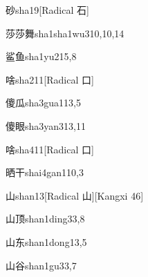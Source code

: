 \begin{verbete}{砂}{sha1}{9}[Radical 石]
\end{verbete}

\begin{verbete}{莎莎舞}{sha1sha1wu3}{10,10,14}
\end{verbete}

\begin{verbete}{鲨鱼}{sha1yu2}{15,8}
\end{verbete}

\begin{verbete}{啥}{sha2}{11}[Radical 口]
\end{verbete}

\begin{verbete}{傻瓜}{sha3gua1}{13,5}
\end{verbete}

\begin{verbete}{傻眼}{sha3yan3}{13,11}
\end{verbete}

\begin{verbete}{啥}{sha4}{11}[Radical 口]
\end{verbete}

\begin{verbete}{晒干}{shai4gan1}{10,3}
\end{verbete}

\begin{verbete}{山}{shan1}{3}[Radical 山][Kangxi 46]
\end{verbete}

\begin{verbete}{山顶}{shan1ding3}{3,8}
\end{verbete}

\begin{verbete}{山东}{shan1dong1}{3,5}
\end{verbete}

\begin{verbete}{山谷}{shan1gu3}{3,7}
\end{verbete}


